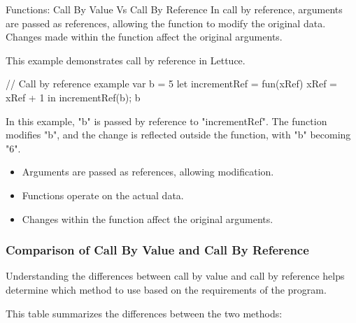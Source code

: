 \begin{notes}{Functions: Call By Value Vs Call By Reference}
    In call by reference, arguments are passed as references, allowing the function to modify the original data. Changes made within the function affect the original arguments.
    
    \begin{highlight}
    
        This example demonstrates call by reference in Lettuce.
    
    \begin{code}[Lettuce]
    // Call by reference example
    var b = 5
    let incrementRef = fun(xRef) {
        xRef = xRef + 1
    } in
    incrementRef(b); b
    \end{code}
    
        In this example, "b" is passed by reference to "incrementRef". The function modifies "b", and the change is reflected outside the function, with "b" becoming "6".
    
        \begin{itemize}
            \item Arguments are passed as references, allowing modification.
            \item Functions operate on the actual data.
            \item Changes within the function affect the original arguments.
        \end{itemize}
    
    \end{highlight}
    
    \subsubsection*{Comparison of Call By Value and Call By Reference}
    
    Understanding the differences between call by value and call by reference helps determine which method to use based on the requirements of the program.
    
    \begin{highlight}
    
        This table summarizes the differences between the two methods:
    

\end{highlight}
\end{notes}

